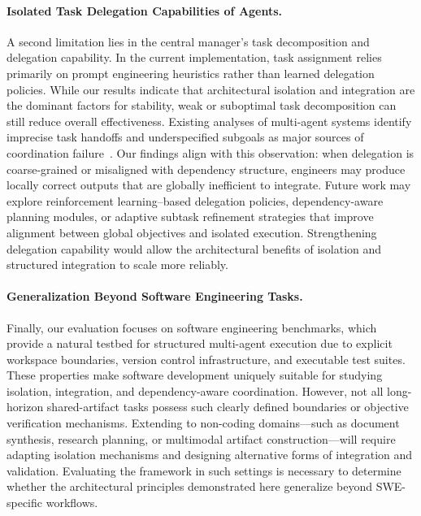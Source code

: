 \paragraph{Isolated Task Delegation Capabilities of Agents.}
A second limitation lies in the central manager’s task decomposition and delegation capability. In the current implementation, task assignment relies primarily on prompt engineering heuristics rather than learned delegation policies. While our results indicate that architectural isolation and integration are the dominant factors for stability, weak or suboptimal task decomposition can still reduce overall effectiveness. Existing analyses of multi-agent systems identify imprecise task handoffs and underspecified subgoals as major sources of coordination failure~\citep{galileo2026failures}. 
Our findings align with this observation: when delegation is coarse-grained or misaligned with dependency structure, engineers may produce locally correct outputs that are globally inefficient to integrate. Future work may explore reinforcement learning–based delegation policies, dependency-aware planning modules, or adaptive subtask refinement strategies that improve alignment between global objectives and isolated execution. Strengthening delegation capability would allow the architectural benefits of isolation and structured integration to scale more reliably.

\paragraph{Generalization Beyond Software Engineering Tasks.}
Finally, our evaluation focuses on software engineering benchmarks, which provide a natural testbed for structured multi-agent execution due to explicit workspace boundaries, version control infrastructure, and executable test suites. These properties make software development uniquely suitable for studying isolation, integration, and dependency-aware coordination. However, not all long-horizon shared-artifact tasks possess such clearly defined boundaries or objective verification mechanisms. Extending \ourmethod to non-coding domains—such as document synthesis, research planning, or multimodal artifact construction—will require adapting isolation mechanisms and designing alternative forms of integration and validation. Evaluating the framework in such settings is necessary to determine whether the architectural principles demonstrated here generalize beyond SWE-specific workflows.